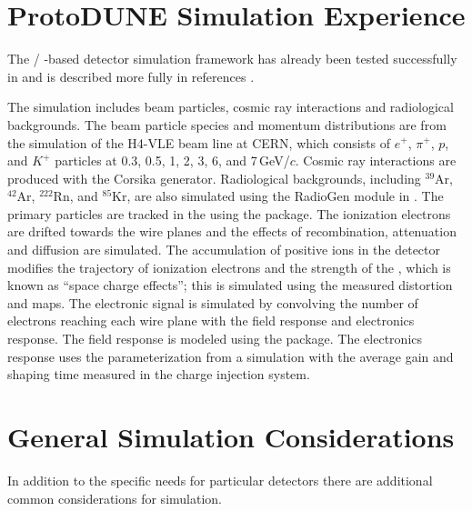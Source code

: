 \documentclass[../main-v1.tex]{subfiles}
\begin{document}
\section{ProtoDUNE Simulation Experience }

The / -based  detector simulation framework has already been tested successfully in  and is described more fully in references \cite{DUNE:2021hwx,DUNE:2020cqd}.

The  simulation includes beam particles, cosmic ray interactions and radiological backgrounds. The beam particle species and momentum distributions are from the  simulation of the H4-VLE beam line at CERN, which consists of $e^{+}$, $\pi^{+}$, $p$, and $K^{+}$ particles at 0.3, 0.5, 1, 2, 3, 6, and 7\,GeV/$c$. Cosmic ray interactions are produced with the Corsika generator. Radiological backgrounds, including $^{39}$Ar, $^{42}$Ar, $^{222}$Rn, and $^{85}$Kr, are also simulated using the RadioGen module in . The primary particles are tracked in the  using the  package. 
The ionization electrons are drifted towards the wire planes %
and the effects of recombination, attenuation and diffusion are simulated. The accumulation of positive ions in the detector modifies the trajectory of ionization electrons and the strength of the \efield, which is 
known as ``space charge effects''; this is simulated using the measured distortion and \efield maps. The electronic signal is simulated by convolving the number of electrons reaching each wire plane with the field response and electronics response. The field response is modeled using the \cite{Veenhof:1998tt} package. 
The electronics response uses the parameterization from a  simulation with the average gain and shaping time measured in the  charge injection system. 
\section{General Simulation Considerations}

In addition to the specific needs for particular detectors there are additional common considerations for simulation. 
\end{document}

